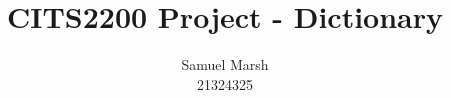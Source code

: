 \documentclass[a4paper]{article}
\title{CITS2200 Project - Dictionary}
\author{Samuel Marsh\\
	\small 21324325
}
\begin{document}
\maketitle





\vfill
\printbibliography
\end{document}
